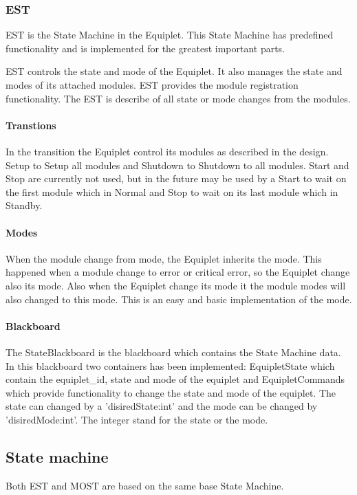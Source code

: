 \documentclass[12pt,a4paper]{report}
\begin{document}
\subsubsection{EST}
EST is the State Machine in the Equiplet. 
This State Machine has predefined functionality and is implemented for the greatest important parts.

EST controls the state and mode of the Equiplet.
It also manages the state and modes of its attached modules.
EST provides the module registration functionality.
The EST is describe of all state or mode changes from the modules.

\paragraph{Transtions}In the transition the Equiplet control its modules as described in the design. Setup to Setup all modules and Shutdown to Shutdown to all modules. Start and Stop are currently not used, but in the future may be used by a Start to wait on the first module which in Normal and Stop to wait on its last module which in Standby.

\paragraph{Modes}When the module change from mode, the Equiplet inherits the mode. This happened when a module change to error or critical error, so the Equiplet change also its mode. Also when the Equiplet change its mode it the module modes will also changed to this mode. This is an easy and basic implementation of the mode.

\paragraph{Blackboard}The StateBlackboard is the blackboard which contains the State Machine data. In this blackboard two containers has been implemented: EquipletState which contain the equiplet\_id, state and mode of the equiplet and EquipletCommands which provide functionality to change the state and mode of the equiplet. The state can changed by a 'disiredState:int' and the mode can be changed by 'disiredMode:int'. The integer stand for the state or the mode.

\subsection{State machine}
Both EST and MOST are based on the same base State Machine. 
\end{document}

